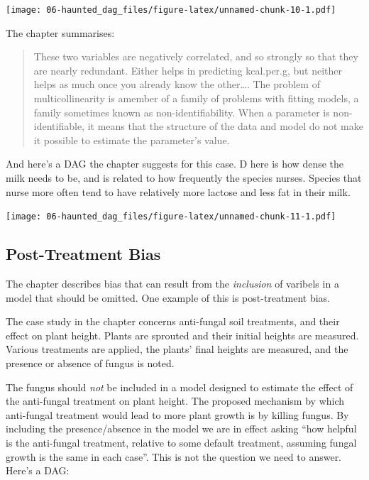 \documentclass[
]{book}
\begin{document}
\texttt{[image: 06-haunted\_dag\_files/figure-latex/unnamed-chunk-10-1.pdf]}

The chapter summarises:

\begin{quote}
These two variables are negatively correlated, and so strongly so that they are nearly redundant. Either helps in predicting kcal.per.g, but neither helps as much once you already know the other\ldots. The problem of multicollinearity is amember of a family of problems with fitting models, a family sometimes known as non-identifiability. When a parameter is non-identifiable, it means that the structure of the data and model do not make it possible to estimate the parameter's value.
\end{quote}

And here's a DAG the chapter suggests for this case. D here is how dense the milk needs to be, and is related to how frequently the species nurses. Species that nurse more often tend to have relatively more lactose and less fat in their milk.

\texttt{[image: 06-haunted\_dag\_files/figure-latex/unnamed-chunk-11-1.pdf]}

\hypertarget{post-treatment-bias}{%
\subsection*{Post-Treatment Bias}\label{post-treatment-bias}}

The chapter describes bias that can result from the \emph{inclusion} of varibels in a model that should be omitted. One example of this is post-treatment bias.

The case study in the chapter concerns anti-fungal soil treatments, and their effect on plant height. Plants are sprouted and their initial heights are measured. Various treatments are applied, the plants' final heights are measured, and the presence or absence of fungus is noted.

The fungus should \emph{not} be included in a model designed to estimate the effect of the anti-fungal treatment on plant height. The proposed mechanism by which anti-fungal treatment would lead to more plant growth is by killing fungus. By including the presence/absence in the model we are in effect asking ``how helpful is the anti-fungal treatment, relative to some default treatment, assuming fungal growth is the same in each case''. This is not the question we need to answer. Here's a DAG:
\end{document}
